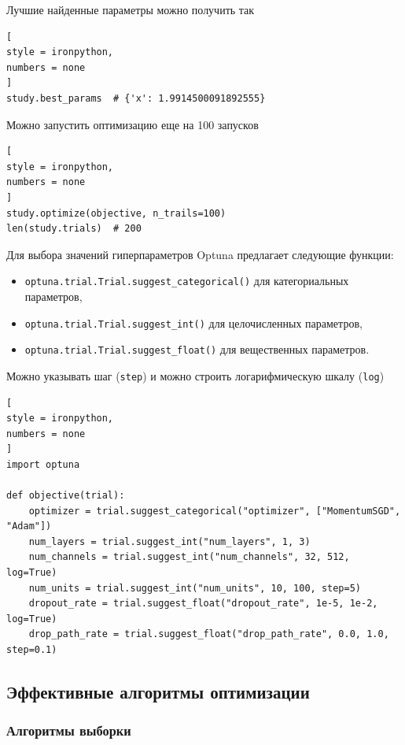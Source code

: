 \documentclass[%
	11pt,
	a4paper,
	utf8,
		]{article}
\begin{document}
Лучшие найденные параметры можно получить так
\begin{lstlisting}[
style = ironpython,
numbers = none	
]
study.best_params  # {'x': 1.9914500091892555}
\end{lstlisting}

Можно запустить оптимизацию еще на 100 запусков
\begin{lstlisting}[
style = ironpython,
numbers = none
]
study.optimize(objective, n_trails=100)
len(study.trials)  # 200
\end{lstlisting}

Для выбора значений гиперпараметров Optuna предлагает следующие функции:
\begin{itemize}
	\item \verb|optuna.trial.Trial.suggest_categorical()| для категориальных параметров,
	
	\item \verb|optuna.trial.Trial.suggest_int()| для целочисленных параметров,
	
	\item \verb|optuna.trial.Trial.suggest_float()| для вещественных параметров.
\end{itemize}

Можно указывать шаг (\verb|step|) и можно строить логарифмическую шкалу (\verb|log|)
\begin{lstlisting}[
style = ironpython,
numbers = none	
]
import optuna

def objective(trial):
    optimizer = trial.suggest_categorical("optimizer", ["MomentumSGD", "Adam"])
    num_layers = trial.suggest_int("num_layers", 1, 3)
    num_channels = trial.suggest_int("num_channels", 32, 512, log=True)
    num_units = trial.suggest_int("num_units", 10, 100, step=5)
    dropout_rate = trial.suggest_float("dropout_rate", 1e-5, 1e-2, log=True)
    drop_path_rate = trial.suggest_float("drop_path_rate", 0.0, 1.0, step=0.1)
\end{lstlisting}

\subsection{Эффективные алгоритмы оптимизации}

\subsubsection{Алгоритмы выборки}
\end{document}
